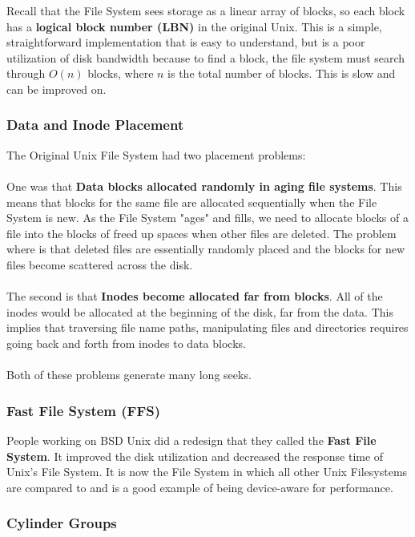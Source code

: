 \documentclass{article}
\begin{document}
Recall that the File System sees storage as a linear array of blocks, so each block has a \textbf{logical block number (LBN)} in the original Unix. This is a simple, straightforward implementation that is easy to understand, but is a poor utilization of disk bandwidth because to find a block, the file system must search through $O(n)$ blocks, where $n$ is the total number of blocks. This is slow and can be improved on.

\subsubsection{Data and Inode Placement}

The Original Unix File System had two placement problems:
\\
\\
One was that \textbf{Data blocks allocated randomly in aging file systems}. This means that blocks for the same file are allocated sequentially when the File System is new. As the File System "ages" and fills, we need to allocate blocks of a file into the blocks of freed up spaces when other files are deleted. The problem where is that deleted files are essentially randomly placed and the blocks for new files become scattered across the disk.
\\
\\
The second is that \textbf{Inodes become allocated far from blocks}. All of the inodes would be allocated at the beginning of the disk, far from the data. This implies that traversing file name paths, manipulating files and directories requires going back and forth from inodes to data blocks.
\\
\\
Both of these problems generate many long seeks.

\subsubsection{Fast File System (FFS)}

People working on BSD Unix did a redesign that they called the \textbf{Fast File System}. It improved the disk utilization and decreased the response time of Unix's File System. It is now the File System in which all other Unix Filesystems are compared to and is a good example of being device-aware for performance.

\subsubsection{Cylinder Groups}
\end{document}
